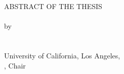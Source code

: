 \newpage
{}
{}
\begin{center}
ABSTRACT OF THE THESIS\\[10pt]
\printtitle \\[5pt]
by \\[15pt]
\\[10pt]
\printdegree\\
University of California, Los Angeles, \\
, Chair
\end{center}   
   
